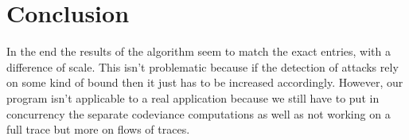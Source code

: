 \documentclass[a4paper]{article}%
\begin{document}
\section*{Conclusion}
In the end the results of the algorithm seem to match the exact entries, with a difference of scale. This isn't problematic because if the detection of attacks rely on some kind of bound then it just has to be increased accordingly. However, our program isn't applicable to a real application because we still have to put in concurrency the separate codeviance computations as well as not working on a full trace but more on flows of traces.


\clearpage
\end{document}
